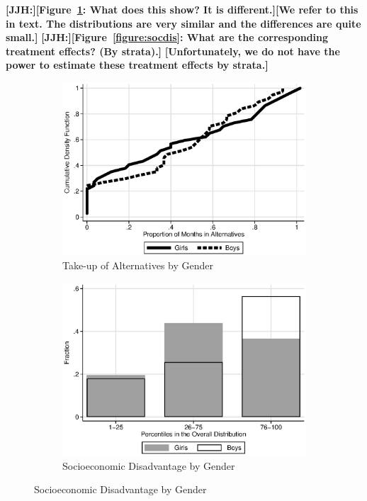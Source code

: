 \textbf{[JJH:][Figure~\ref{figure:altgender}: What does this show? It is different.][We refer to this in text. The distributions are very similar and the differences are quite small.]}
\textbf{[JJH:][Figure~\ref{figure:socdis}: What are the corresponding treatment effects? (By strata).]}
\textbf{[Unfortunately, we do not have the power to estimate these treatment effects by strata.]}

\begin{figure}
\centering
\caption{Gender and Baseline Socioeconomic Disadvantage in the Control Group} \label{figure:socdis}
\begin{subfigure}[h]{0.4\textwidth}
	\centering
	\caption{Take-up of Alternatives by Gender} \label{figure:altgender}
	\includegraphics[width=\textwidth]{output/abccare_controlcontamination_boysgirls}
\end{subfigure}%
\begin{subfigure}[h]{0.4\textwidth}
	\centering
	\caption{Socioeconomic Disadvantage by Gender} \label{figure:disadgender}
	\includegraphics[width=\textwidth]{output/factorbase_girlsboyscompare}

\end{subfigure}
\end{figure}
